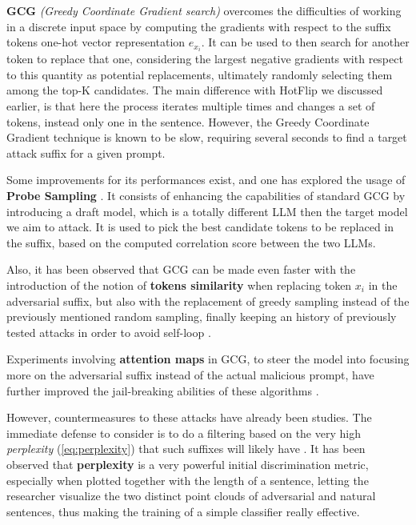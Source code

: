 \documentclass[../thesis]{subfiles}
\begin{document}

\textbf{GCG} \emph{(Greedy Coordinate Gradient search)} overcomes the difficulties of working in a discrete input space by computing the gradients with respect to the suffix tokens one-hot vector representation $e_{x_i}$. It can be used to then search for another token to replace that one, considering the largest negative gradients with respect to this quantity as potential replacements, ultimately randomly selecting them among the top-K candidates.
The main difference with HotFlip we discussed earlier, is that here the process iterates multiple times and changes a set of tokens, instead only one in the sentence.
However, the Greedy Coordinate Gradient technique is known to be slow, requiring several seconds to find a target attack suffix for a given prompt.

Some improvements for its performances exist, and one has explored the usage of \textbf{Probe Sampling} \citep{accelerating-gcg}.
It consists of enhancing the capabilities of standard GCG by introducing a draft model, which is a totally different LLM then the target model we aim to attack. It is used to pick the best candidate tokens to be replaced in the suffix, based on the computed correlation score between the two LLMs.

Also, it has been observed that GCG can be made even faster with the introduction of the notion of \textbf{tokens similarity} when replacing token $x_i$ in the adversarial suffix, but also with the replacement of greedy sampling instead of the previously mentioned random sampling, finally keeping an history of previously tested attacks in order to avoid self-loop \citep{faster-gcg}.

Experiments involving \textbf{attention maps} in GCG, to steer the model into focusing more on the adversarial suffix instead of the actual malicious prompt, have further improved the jail-breaking abilities of these algorithms \citep{gcg-with-attention--attngcg}.

However, countermeasures to these attacks have already been studies. The immediate defense to consider is to do a filtering based on the very high \emph{perplexity} (\cref{eq:perplexity}) that such suffixes will likely have \citep{alon2023detectinglanguagemodelattacks-perplexity}. It has been observed that \textbf{perplexity} is a very powerful initial discrimination metric, especially when plotted together with the length of a sentence, letting the researcher visualize the two distinct point clouds of adversarial and natural sentences, thus making the training of a simple classifier really effective.
\end{document}
